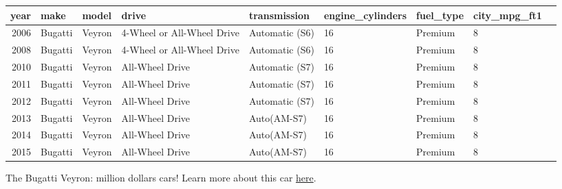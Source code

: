 \documentclass[11pt]{article}
\begin{document}
    \begin{tabular}{r|llllllll}
 year & make & model & drive & transmission & engine\_cylinders & fuel\_type & city\_mpg\_ft1\\
\hline
	 2006                       & Bugatti                    & Veyron                     & 4-Wheel or All-Wheel Drive & Automatic (S6)             & 16                         & Premium                    & 8                         \\
	 2008                       & Bugatti                    & Veyron                     & 4-Wheel or All-Wheel Drive & Automatic (S6)             & 16                         & Premium                    & 8                         \\
	 2010                       & Bugatti                    & Veyron                     & All-Wheel Drive            & Automatic (S7)             & 16                         & Premium                    & 8                         \\
	 2011                       & Bugatti                    & Veyron                     & All-Wheel Drive            & Automatic (S7)             & 16                         & Premium                    & 8                         \\
	 2012                       & Bugatti                    & Veyron                     & All-Wheel Drive            & Automatic (S7)             & 16                         & Premium                    & 8                         \\
	 2013                       & Bugatti                    & Veyron                     & All-Wheel Drive            & Auto(AM-S7)                & 16                         & Premium                    & 8                         \\
	 2014                       & Bugatti                    & Veyron                     & All-Wheel Drive            & Auto(AM-S7)                & 16                         & Premium                    & 8                         \\
	 2015                       & Bugatti                    & Veyron                     & All-Wheel Drive            & Auto(AM-S7)                & 16                         & Premium                    & 8                         \\
\end{tabular}


    
    The Bugatti Veyron: million dollars cars! Learn more about this car
\href{https://en.wikipedia.org/wiki/Bugatti_Veyron}{here}.
\end{document}
